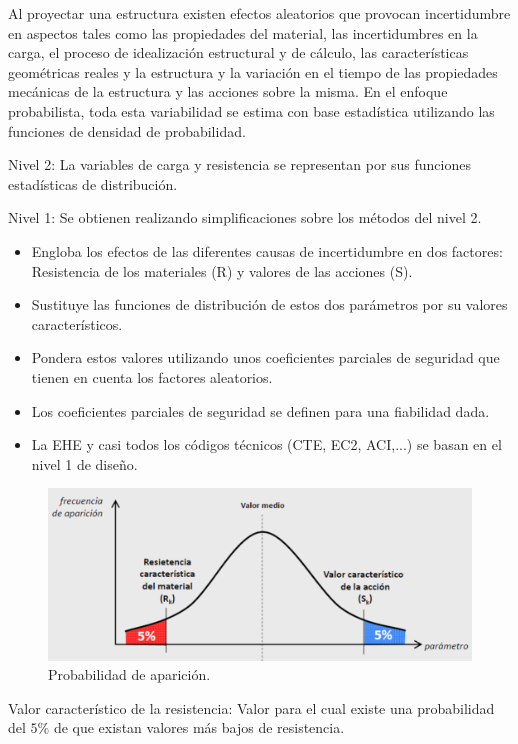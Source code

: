 Al proyectar una estructura existen efectos aleatorios que provocan incertidumbre en aspectos tales como las propiedades del material, las incertidumbres en la carga, el proceso de idealización estructural y de cálculo, las características geométricas reales y la estructura y la variación en el tiempo de las propiedades mecánicas de la estructura y las acciones sobre la misma. En el enfoque probabilista, toda esta variabilidad se estima con base estadística utilizando las funciones de densidad de probabilidad.

Nivel 2: La variables de carga y resistencia se representan por sus funciones estadísticas de distribución.

Nivel 1: Se obtienen realizando simplificaciones sobre los métodos del nivel 2.
\begin{itemize}
    \item Engloba los efectos de las diferentes causas de incertidumbre en dos factores: Resistencia de los materiales (R) y valores de las acciones (S).
    \item Sustituye las funciones de distribución de estos dos parámetros por su valores característicos.
    \item Pondera estos valores utilizando unos coeficientes parciales de seguridad que tienen en cuenta los factores aleatorios.
    \item Los coeficientes parciales de seguridad se definen para una fiabilidad dada.
    \item La EHE y casi todos los códigos técnicos (CTE, EC2, ACI,...) se basan en el nivel 1 de diseño.
\end{itemize}

\begin{figure}[h]
    \centering
    \includegraphics[width=0.75\linewidth]{Imagenes/Valor caracteristico resistencia accion.png}
    \caption{Probabilidad de aparición.}
\end{figure}

Valor característico de la resistencia: Valor para el cual existe una probabilidad del $5\%$ de que existan valores más bajos de resistencia.


